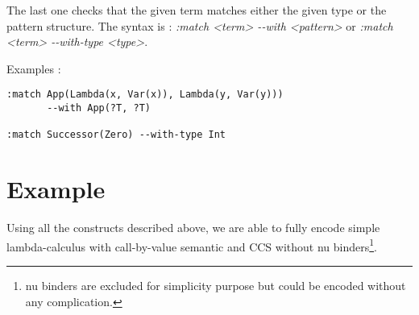 \documentclass[12pt,a4paper]{article}
\begin{document}
The last one checks that the given term matches either the given type
or the pattern structure. The syntax is : \emph{:match <term> -{}-with
  <pattern>} or \emph{:match <term> -{}-with-type <type>}.

Examples : 
\begin{verbatim}
:match App(Lambda(x, Var(x)), Lambda(y, Var(y))) 
       --with App(?T, ?T) 

:match Successor(Zero) --with-type Int
\end{verbatim}


\section{Example}
Using all the constructs described above, we are able to fully encode simple 
lambda-calculus with call-by-value semantic and CCS without nu binders\footnote{nu 
binders are excluded for simplicity purpose but could be encoded without any 
complication.}.
\end{document}
